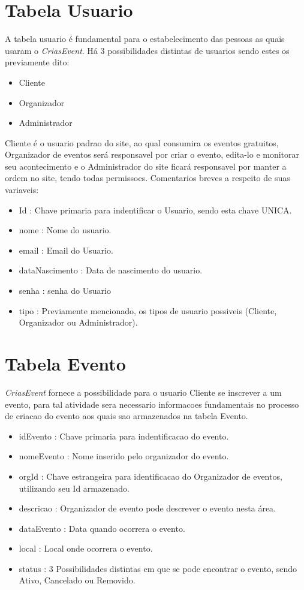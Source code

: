 \section{Tabela Usuario}
A tabela usuario é fundamental para o estabelecimento das pessoas as quais usaram o \textit{CriasEvent}. Há 3 possibilidades distintas de usuarios sendo estes os previamente dito:
\begin{itemize}
    \item Cliente
    \item Organizador
    \item Administrador
\end{itemize}
Cliente é o usuario padrao do site, ao qual consumira os eventos gratuitos, Organizador de eventos será responsavel por criar o evento, edita-lo e monitorar seu acontecimento e o Administrador do site ficará responsavel por manter a ordem no site, tendo todas permissoes.
Comentarios breves a respeito de suas variaveis:
\begin{itemize}
    \item Id : Chave primaria para indentificar o Usuario, sendo esta chave UNICA.
    \item nome : Nome do usuario.
    \item email : Email do Usuario.
    \item dataNascimento : Data de nascimento do usuario.
    \item senha : senha do Usuario
    \item tipo : Previamente mencionado, os tipos de usuario possiveis (Cliente, Organizador ou Administrador).
\end{itemize}

\section{Tabela Evento}
\textit{CriasEvent} fornece a possibilidade para o usuario Cliente se inscrever a um evento, para tal atividade sera necessario informacoes fundamentais no processo de criacao do evento aos quais sao armazenados na tabela Evento.

\begin{itemize}
    \item idEvento : Chave primaria para indentificacao do evento.
    \item nomeEvento : Nome inserido pelo organizador do evento.
    \item orgId : Chave estrangeira para identificacao do Organizador de eventos, utilizando seu Id armazenado.
    \item descricao : Organizador de evento pode descrever o evento nesta área.
    \item dataEvento : Data quando ocorrera o evento.
    \item local : Local onde ocorrera o evento.
    \item status : 3 Possibilidades distintas em que se pode encontrar o evento, sendo Ativo, Cancelado ou Removido.
\end{itemize}

